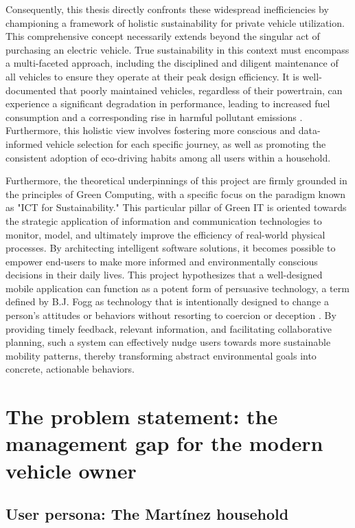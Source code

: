 \textgap

Consequently, this thesis directly confronts these widespread inefficiencies by championing a framework of holistic sustainability for private vehicle utilization. This comprehensive concept necessarily extends beyond the singular act of purchasing an electric vehicle. True sustainability in this context must encompass a multi-faceted approach, including the disciplined and diligent maintenance of all vehicles to ensure they operate at their peak design efficiency. It is well-documented that poorly maintained vehicles, regardless of their powertrain, can experience a significant degradation in performance, leading to increased fuel consumption and a corresponding rise in harmful pollutant emissions \cite{iea2021fuel}. Furthermore, this holistic view involves fostering more conscious and data-informed vehicle selection for each specific journey, as well as promoting the consistent adoption of eco-driving habits among all users within a household.

\textgap

Furthermore, the theoretical underpinnings of this project are firmly grounded in the principles of Green Computing, with a specific focus on the paradigm known as "ICT for Sustainability." This particular pillar of Green IT is oriented towards the strategic application of information and communication technologies to monitor, model, and ultimately improve the efficiency of real-world physical processes. By architecting intelligent software solutions, it becomes possible to empower end-users to make more informed and environmentally conscious decisions in their daily lives. This project hypothesizes that a well-designed mobile application can function as a potent form of persuasive technology, a term defined by B.J. Fogg as technology that is intentionally designed to change a person's attitudes or behaviors without resorting to coercion or deception \cite{fogg2002persuasive}. By providing timely feedback, relevant information, and facilitating collaborative planning, such a system can effectively nudge users towards more sustainable mobility patterns, thereby transforming abstract environmental goals into concrete, actionable behaviors.

\section{The problem statement: the management gap for the modern vehicle owner}

\subsection{User persona: The Martínez household}

